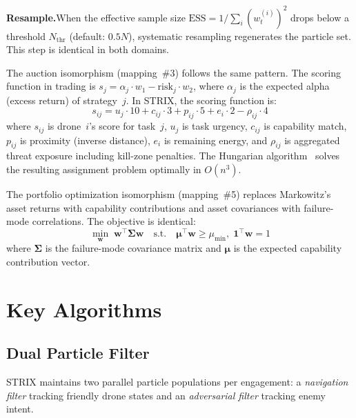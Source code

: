 \documentclass[conference]{IEEEtran}
\newcommand{\weight}{w}
\begin{document}
\textbf{Resample.}\quad  When the effective sample size
$\text{ESS} = 1/\sum_i (\weight_t^{(i)})^2$ drops below a threshold
$N_{\text{thr}}$ (default: $0.5N$), systematic resampling regenerates
the particle set.  This step is identical in both domains.

The auction isomorphism (mapping~\#3) follows the same pattern.
The scoring function in trading is
$s_j = \alpha_j \cdot w_1 - \text{risk}_j \cdot w_2$,
where $\alpha_j$ is the expected alpha (excess return) of strategy~$j$.
In STRIX, the scoring function is:
\begin{equation}
\label{eq:bid}
  s_{ij} = u_j \!\cdot\! 10 + c_{ij} \!\cdot\! 3 + p_{ij} \!\cdot\! 5
         + e_i \!\cdot\! 2 - \rho_{ij} \!\cdot\! 4
\end{equation}
where $s_{ij}$ is drone~$i$'s score for task~$j$, $u_j$ is task
urgency, $c_{ij}$ is capability match, $p_{ij}$ is proximity
(inverse distance), $e_i$ is remaining energy, and $\rho_{ij}$ is
aggregated threat exposure including kill-zone penalties.  The
Hungarian algorithm~\cite{kuhn1955hungarian} solves the resulting
assignment problem optimally in $O(n^3)$.

The portfolio optimization isomorphism (mapping~\#5) replaces
Markowitz's~\cite{markowitz1952portfolio} asset returns with
capability contributions and asset covariances with failure-mode
correlations.  The objective is identical:
\begin{equation}
\label{eq:portfolio}
  \min_{\mathbf{w}} \;\mathbf{w}^\top \boldsymbol{\Sigma} \mathbf{w}
  \quad \text{s.t.} \quad
  \boldsymbol{\mu}^\top \mathbf{w} \geq \mu_{\min},\;
  \mathbf{1}^\top \mathbf{w} = 1
\end{equation}
where $\boldsymbol{\Sigma}$ is the failure-mode covariance matrix and
$\boldsymbol{\mu}$ is the expected capability contribution vector.


\section{Key Algorithms}
\label{sec:algorithms}

\subsection{Dual Particle Filter}
\label{sec:pf}

STRIX maintains two parallel particle populations per engagement:
a \emph{navigation filter} tracking friendly drone states and an
\emph{adversarial filter} tracking enemy intent.
\end{document}
